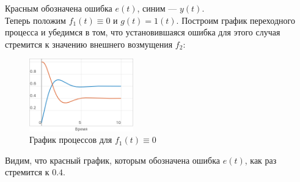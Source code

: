 \documentclass[a4paper]{article}
\begin{document}
Красным обозначена ошибка $e(t)$, синим --- $y(t)$.\\[0.5em]
Теперь положим $f_1(t) \equiv 0$ и $g(t) = 1(t)$. Построим график переходного процесса и убедимся в том, что установившаяся ошибка для этого случая стремится к значению внешнего возмущения $f_2$:
\begin{figure}[H]
    \centering
    \includegraphics[width=0.4\textwidth]{sources/task3_f1=0.png}
    \caption{График процессов для $f_1(t) \equiv 0$}
\end{figure}
Видим, что красный график, которым обозначена ошибка $e(t)$, как раз стремится к $0.4$.
\end{document}
